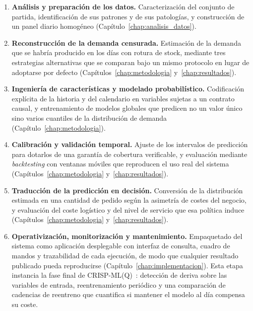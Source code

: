 \begin{enumerate}
    \item \textbf{Análisis y preparación de los datos.} Caracterización del conjunto de partida,
    identificación de sus patrones y de sus patologías, y construcción de un panel diario homogéneo
    (Capítulo~\ref{chap:analisis_datos}).
    \item \textbf{Reconstrucción de la demanda censurada.} Estimación de la demanda que se habría
    producido en los días con rotura de stock, mediante tres estrategias alternativas que se
    comparan bajo un mismo protocolo en lugar de adoptarse por defecto
    (Capítulos~\ref{chap:metodologia} y~\ref{chap:resultados}).
    \item \textbf{Ingeniería de características y modelado probabilístico.} Codificación explícita
    de la historia y del calendario en variables sujetas a un contrato causal, y entrenamiento de
    modelos globales que predicen no un valor único sino varios cuantiles de la distribución de
    demanda (Capítulo~\ref{chap:metodologia}).
    \item \textbf{Calibración y validación temporal.} Ajuste de los intervalos de predicción para
    dotarlos de una garantía de cobertura verificable, y evaluación mediante \textit{backtesting}
    con ventanas móviles que reproducen el uso real del sistema
    (Capítulos~\ref{chap:metodologia} y~\ref{chap:resultados}).
    \item \textbf{Traducción de la predicción en decisión.} Conversión de la distribución estimada
    en una cantidad de pedido según la asimetría de costes del negocio, y evaluación del coste
    logístico y del nivel de servicio que esa política induce
    (Capítulos~\ref{chap:metodologia} y~\ref{chap:resultados}).
    \item \textbf{Operativización, monitorización y mantenimiento.} Empaquetado del sistema como
    aplicación desplegable con interfaz de consulta, cuadro de mandos y trazabilidad de cada
    ejecución, de modo que cualquier resultado publicado pueda reproducirse
    (Capítulo~\ref{chap:implementacion}). Esta etapa instancia la fase final de
    CRISP-ML(Q)~\cite{studer2021crispmlq}: detección de deriva sobre las variables de entrada,
    reentrenamiento periódico y una comparación de cadencias de reentreno que cuantifica si
    mantener el modelo al día compensa su coste.
\end{enumerate}

